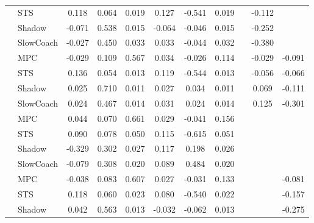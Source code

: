 \begin{tabular}{|l|l|*{9}{c|}}
                                                           & STS &    0.118 &     0.064 &     0.019 &  0.127 & -0.541 &  0.019 &      &  -0.112 &       \\
                                                           & Shadow &   -0.071 &     0.538 &     0.015 & -0.064 & -0.046 &  0.015 &      &  -0.252 &       \\
                                                           & SlowCoach &   -0.027 &     0.450 &     0.033 &  0.033 & -0.044 &  0.032 &      &  -0.380 &       \\
\midrule
[True, True, True, True, True, True, False, True, True] & MPC &   -0.029 &     0.109 &     0.567 &  0.034 & -0.026 &  0.114 &      &  -0.029 &   -0.091 \\
                                                           & STS &    0.136 &     0.054 &     0.013 &  0.119 & -0.544 &  0.013 &      &  -0.056 &   -0.066 \\
                                                           & Shadow &    0.025 &     0.710 &     0.011 &  0.027 &  0.034 &  0.011 &      &   0.069 &   -0.111 \\
                                                           & SlowCoach &    0.024 &     0.467 &     0.014 &  0.031 &  0.024 &  0.014 &      &   0.125 &   -0.301 \\
\midrule
[True, True, True, True, True, True, False, False, False] & MPC &    0.044 &     0.070 &     0.661 &  0.029 & -0.041 &  0.156 &      &      &       \\
                                                           & STS &    0.090 &     0.078 &     0.050 &  0.115 & -0.615 &  0.051 &      &      &       \\
                                                           & Shadow &   -0.329 &     0.302 &     0.027 &  0.117 &  0.198 &  0.026 &      &      &       \\
                                                           & SlowCoach &   -0.079 &     0.308 &     0.020 &  0.089 &  0.484 &  0.020 &      &      &       \\
\midrule
[True, True, True, True, True, True, False, False, True] & MPC &   -0.038 &     0.083 &     0.607 &  0.027 & -0.031 &  0.133 &      &      &   -0.081 \\
                                                           & STS &    0.118 &     0.060 &     0.023 &  0.080 & -0.540 &  0.022 &      &      &   -0.157 \\
                                                           & Shadow &    0.042 &     0.563 &     0.013 & -0.032 & -0.062 &  0.013 &      &      &   -0.275 \\

\end{tabular}
